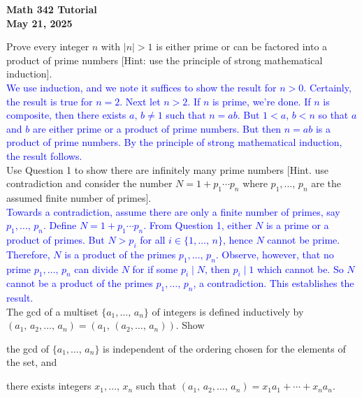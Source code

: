\documentclass[a4paper,11pt]{article}
\theoremstyle{mythm}
\theoremstyle{mydef}
\newcommand{\blue}[1]{\textcolor{blue}{#1}}
\newcommand{\abs}[1]{\left\vert #1 \right\vert}
\begin{document}
\begin{center}
  {\Large\bfseries Math 342 Tutorial} \\
  {\normalsize\bf May 21, 2025}
\end{center}

 Prove every integer $n$ with $\abs{n}>1$ is either
prime or can be factored into a product of prime numbers [Hint: use the
principle of strong mathematical induction]. \\

\blue{We use induction, and we note it suffices to show the result for $n>0$.
Certainly, the result is true for $n=2$. Next let $n>2$. If $n$ is prime, we're
done. If $n$ is composite, then there exists $a,\,b \neq 1$ such that $n=ab$.
But $1<a,\,b < n$ so that $a$ and $b$ are either prime or a product of prime
numbers. But then $n=ab$ is a product of prime numbers. By the principle of
strong mathematical induction, the result follows.} \\

 Use Question 1 to show there are infinitely many
prime numbers [Hint. use contradiction and consider the number $N=1+p_1 \cdots
p_n$ where $p_1,\dots,\,p_n$ are the assumed finite number of primes]. \\

\blue{Towards a contradiction, assume there are only a finite number of primes,
  say $p_1,\dots,\,p_n$. Define $N=1+p_1 \cdots p_n$. From Question 1, either
  $N$ is a prime or a product of primes. But $N>p_i$ for all $i \in
  \{1,\dots,\,n\}$, hence $N$ cannot be prime. Therefore, $N$ is a product of
  the primes $p_1,\dots,\,p_n$. Observe, however, that no prime
  $p_1,\dots,\,p_n$ can divide $N$ for if some $p_i \mid N$, then $p_i \mid 1$
  which cannot be. So $N$ cannot be a product of the primes
  $p_1,\dots,\,p_n$, a contradiction. This establishes the result.} \\

 The gcd of a multiset $\{a_1,\dots,\,a_n\}$ of
integers is defined inductively by
$(a_1,\,a_2,\dots,\,a_n)=(a_1,\,(a_2,\dots,\,a_n))$. Show
\begin{enumerate*}[{\bf (a)}]
\item the gcd of $\{a_1,\dots,\,a_n\}$ is independent of the ordering chosen for
  the elements of the set, and
\item there exists integers $x_1,\dots,\,x_n$ such that $(a_1,\,a_2,\dots,\,a_n)
  = x_1a_1 + \cdots + x_na_n$.
\end{enumerate*}
\end{document}
